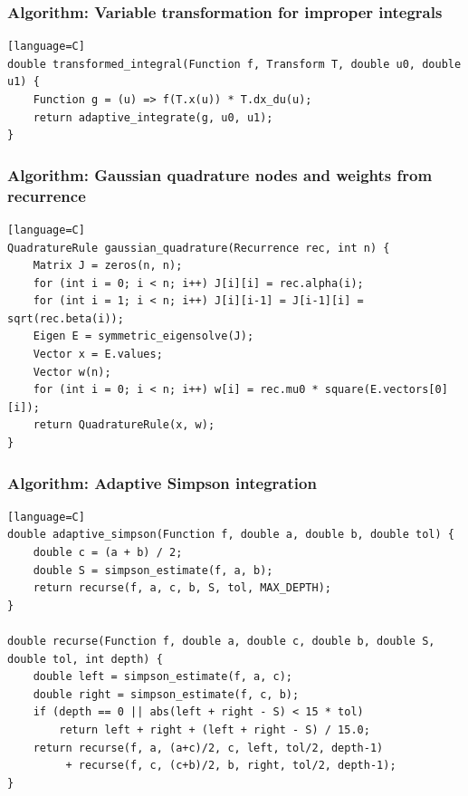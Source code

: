 \documentclass[11pt]{article}
\begin{document}
\subsubsection{Algorithm: Variable transformation for improper integrals}\label{algorithm-variable-transformation-for-improper-integrals}

\begin{verbatim}[language=C]
double transformed_integral(Function f, Transform T, double u0, double u1) {
    Function g = (u) => f(T.x(u)) * T.dx_du(u);
    return adaptive_integrate(g, u0, u1);
}
\end{verbatim}

\subsubsection{Algorithm: Gaussian quadrature nodes and weights from recurrence}\label{algorithm-gaussian-quadrature-nodes-and-weights-from-recurrence}

\begin{verbatim}[language=C]
QuadratureRule gaussian_quadrature(Recurrence rec, int n) {
    Matrix J = zeros(n, n);
    for (int i = 0; i < n; i++) J[i][i] = rec.alpha(i);
    for (int i = 1; i < n; i++) J[i][i-1] = J[i-1][i] = sqrt(rec.beta(i));
    Eigen E = symmetric_eigensolve(J);
    Vector x = E.values;
    Vector w(n);
    for (int i = 0; i < n; i++) w[i] = rec.mu0 * square(E.vectors[0][i]);
    return QuadratureRule(x, w);
}
\end{verbatim}

\subsubsection{Algorithm: Adaptive Simpson integration}\label{algorithm-adaptive-simpson-integration}

\begin{verbatim}[language=C]
double adaptive_simpson(Function f, double a, double b, double tol) {
    double c = (a + b) / 2;
    double S = simpson_estimate(f, a, b);
    return recurse(f, a, c, b, S, tol, MAX_DEPTH);
}

double recurse(Function f, double a, double c, double b, double S, double tol, int depth) {
    double left = simpson_estimate(f, a, c);
    double right = simpson_estimate(f, c, b);
    if (depth == 0 || abs(left + right - S) < 15 * tol)
        return left + right + (left + right - S) / 15.0;
    return recurse(f, a, (a+c)/2, c, left, tol/2, depth-1)
         + recurse(f, c, (c+b)/2, b, right, tol/2, depth-1);
}
\end{verbatim}
\end{document}

